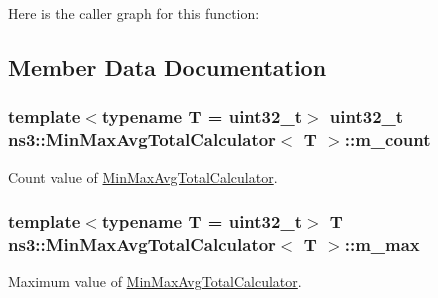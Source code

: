 Here is the caller graph for this function\+:




\subsection{Member Data Documentation}
\subsubsection[{\texorpdfstring{m\+\_\+count}{m_count}}]{\setlength{\rightskip}{0pt plus 5cm}template$<$typename T = uint32\+\_\+t$>$ uint32\+\_\+t {\bf ns3\+::\+Min\+Max\+Avg\+Total\+Calculator}$<$ T $>$\+::m\+\_\+count\hspace{0.3cm}{\ttfamily [protected]}}\hypertarget{classns3_1_1MinMaxAvgTotalCalculator_a6bbdda90ca99cd6188edd12cac6c67f2}{}\label{classns3_1_1MinMaxAvgTotalCalculator_a6bbdda90ca99cd6188edd12cac6c67f2}


Count value of \hyperlink{classns3_1_1MinMaxAvgTotalCalculator}{Min\+Max\+Avg\+Total\+Calculator}. 

\subsubsection[{\texorpdfstring{m\+\_\+max}{m_max}}]{\setlength{\rightskip}{0pt plus 5cm}template$<$typename T = uint32\+\_\+t$>$ T {\bf ns3\+::\+Min\+Max\+Avg\+Total\+Calculator}$<$ T $>$\+::m\+\_\+max\hspace{0.3cm}{\ttfamily [protected]}}\hypertarget{classns3_1_1MinMaxAvgTotalCalculator_a70efcbd101164de6bdc00a33fd1e99ed}{}\label{classns3_1_1MinMaxAvgTotalCalculator_a70efcbd101164de6bdc00a33fd1e99ed}


Maximum value of \hyperlink{classns3_1_1MinMaxAvgTotalCalculator}{Min\+Max\+Avg\+Total\+Calculator}. 

